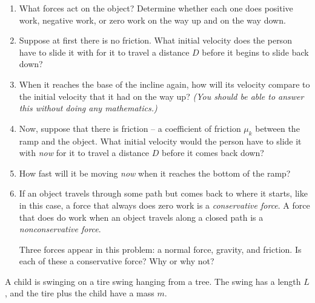 \documentclass[12pt]{article}
\begin{document}
\begin{enumerate}

\item What forces act on the object? Determine whether each one does positive work, negative work, or zero work on the way up and on the way down.

\vspace{2in}

\item	Suppose at first there is no friction. What initial velocity does the person have to slide it with for it to travel a distance $D$ before it begins to slide back down? 

\vspace{2.5in}

\item	When it reaches the base of the incline again, how will its velocity compare to the initial velocity that it had on the way up? {\it (You should be able to answer this without doing any mathematics.)}

\vspace{2in}

\newpage

\item	Now, suppose that there is friction -- a coefficient of friction $\mu_k$ between the ramp and the object. 
What initial velocity would the person have to slide it with {\it now} for it to travel a distance $D$ before it comes back down?

\vspace{3in}


\item How fast will it be moving {\it now} when it reaches the bottom of the ramp? 

\vspace{3.7in}

\item If an object travels through some path but comes back to where it starts, like in this case, a force that always does zero work is a {\it conservative force}. A force that does do work when an object travels along a closed path is a {\it nonconservative force}.

Three forces appear in this problem: a normal force, gravity, and friction. Is each of these a conservative force? Why or why not?

\end{enumerate}
\newpage

 
 A child is swinging on a tire swing hanging from a tree. The swing has a length $L$, and the
 	tire plus the child have a mass $m$.
 	
\end{document}
